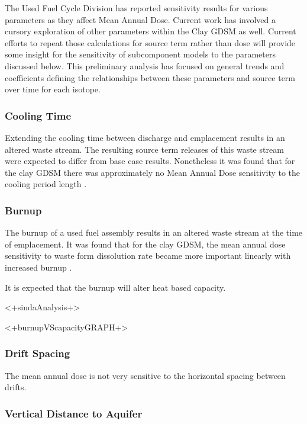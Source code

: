 The Used Fuel Cycle Division has reported sensitivity results for various 
parameters as they affect Mean Annual Dose. Current work has involved a cursory  
exploration of other parameters within the Clay \gls{GDSM} as well. Current 
efforts to repeat those calculations for source term rather than 
dose will provide some insight for the sensitivity of subcomponent models to the 
parameters discussed below. This preliminary analysis has focused on general 
trends and coefficients defining the relationships between these 
parameters and source term over time for each isotope. 

\subsubsection{Cooling Time}

Extending the cooling time between discharge and emplacement results
in an altered waste stream. The resulting source term releases
of this waste stream were expected to differ from base case results. 
Nonetheless it was found that for the clay \gls{GDSM} there was approximately 
no Mean Annual Dose sensitivity to the cooling period length 
\cite{clayton_generic_2011}.

\subsubsection{Burnup}

The burnup of a used fuel assembly results in an altered waste stream at the 
time of emplacement. It was found that for the clay \gls{GDSM}, the mean 
annual dose sensitivity to waste form dissolution rate became more important 
linearly with increased burnup \cite{clayton_generic_2011}.

It is expected that the burnup will alter heat based capacity. 

<+sindaAnalysis+>

<+burnupVScapacityGRAPH+>


\subsubsection{Drift Spacing}

The mean annual dose is not very sensitive to the horizontal spacing between 
drifts. 

\subsubsection{Vertical Distance to Aquifer}

